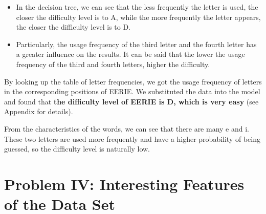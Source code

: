 \documentclass[12pt]{article}
\begin{document}
\begin{itemize}
    \setlength{\parskip}{0.2pt}
    \item In the decision tree, we can see that the less frequently the letter is used, the closer the difficulty level is to A, while the more frequently the letter appears, the closer the difficulty level is to D.
    \item Particularly, the usage frequency of the third letter and the fourth letter has a greater influence on the results. It can be said that the lower the usage frequency of the third and fourth letters, higher the difficulty.
\end{itemize}


By looking up the table of letter frequencies, we got the usage frequency of letters in the corresponding positions of EERIE. We substituted the data into the model and found that \textbf{the difficulty level of EERIE is D, which is very easy}  (see Appendix for details).

From the characteristics of the words, we can see that there are many e and i. These two letters are used more frequently and have a higher probability of being guessed, so the difficulty level is naturally low.

\section{Problem IV: Interesting Features of the Data Set}%
\end{document}
